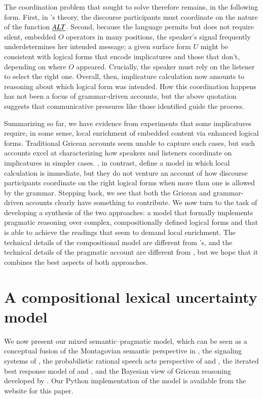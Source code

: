 \documentclass[leqno,12pt]{article}
\begin{document}
The coordination problem that \citeauthor{Grice75} sought to solve
therefore remains, in the following form. First, in \CFS's theory, the
discourse participants must coordinate on the nature of the function
$\emph{ALT}$.  Second, because the language permits but does not require
silent, embedded $O$ operators in many positions, the speaker's signal
frequently underdetermines her intended message; a given surface form
$U$ might be consistent with logical forms that encode implicatures
and those that don't, depending on where $O$ appeared. Crucially, the
speaker must rely on the listener to select the right one.  Overall,
then, implicature calculation now amounts to reasoning about which
logical form was intended. How this coordination happens has not been
a focus of grammar-driven accounts, but the above quotation suggests
that communicative pressures like those \citeauthor{Grice75}
identified guide the process.

Summarizing so far, we have evidence from
 experiments that some implicatures
require, in some sense, local enrichment of embedded content via
enhanced logical forms. Traditional Gricean accounts seem unable to
capture such cases, but such accounts excel at characterizing how
speakers and listeners coordinate on implicatures in simpler
cases. \CFS, in contrast, define a model in which local calculation is
immediate, but they do not venture an account of how discourse
participants coordinate on the right logical forms when more than one
is allowed by the grammar. Stepping back, we see that both the Gricean
and grammar-driven accounts clearly have something to contribute. We
now turn to the task of developing a synthesis of the two approaches:
a model that formally implements pragmatic reasoning over complex,
compositionally defined logical forms and that is able to achieve the
readings that seem to demand local enrichment. The technical details
of the compositional model are different from \CFS's, and the
technical details of the pragmatic account are different from
\citeauthor{Grice75}, but we hope that it combines the best aspects of
both approaches.


\section{A compositional lexical uncertainty model}\label{sec:model}

We now present our mixed semantic--pragmatic model, which can be seen
as a conceptual fusion of the Montagovian semantic perspective in
\citet{Lewis70GS}, the signaling systems of \citet{Lewis69}, the
probabilistic rational speech acts perspective of
\citet{Frank:Goodman:2012} and \citet{Goodman:Stuhlmuller:2013}, the
iterated best response model of \citet{Jaeger:2007,Jaeger:2011} and
\citet{Franke09DISS}, and the Bayesian view of Gricean reasoning
developed by \citet{Russell:2012}.  Our Python implementation of the
model is available from the website for this paper.
\end{document}
